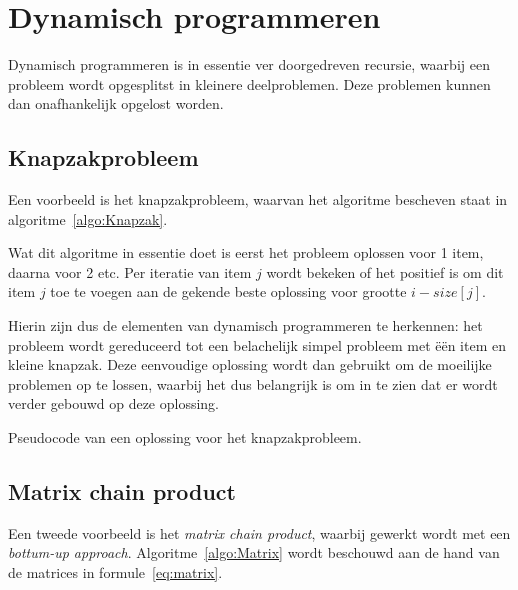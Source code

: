\chapter{Dynamisch programmeren}
Dynamisch programmeren is in essentie ver doorgedreven recursie, waarbij een probleem wordt opgesplitst in kleinere deelproblemen.
Deze problemen kunnen dan onafhankelijk opgelost worden.

\section{Knapzakprobleem}
Een voorbeeld is het knapzakprobleem, waarvan het algoritme bescheven staat in algoritme~\ref{algo:Knapzak}.

Wat dit algoritme in essentie doet is eerst het probleem oplossen voor 1 item, daarna voor 2 etc. 
Per iteratie van item $j$ wordt bekeken of het positief is om dit item $j$ toe te voegen aan de gekende beste oplossing voor grootte $i - size[j]$.

Hierin zijn dus de elementen van dynamisch programmeren te herkennen: het probleem wordt gereduceerd tot een belachelijk simpel probleem met \"e\"en item en kleine knapzak.
Deze eenvoudige oplossing wordt dan gebruikt om de moeilijke problemen op te lossen, waarbij het dus belangrijk is om in te zien dat er wordt verder gebouwd op deze oplossing.

\begin{algorithm}
    \caption{Pseudocode van een oplossing voor het knapzakprobleem.}
    \label{algo:Knapzak}
    \begin{algorithmic}
         
             
                    \EndIf
                \EndIf
            \EndFor    
        \EndFor
    \end{algorithmic}
\end{algorithm}

\section{Matrix chain product}
Een tweede voorbeeld is het \emph{matrix chain product}, waarbij gewerkt wordt met een \emph{bottum-up approach}. 
Algoritme~\ref{algo:Matrix} wordt beschouwd aan de hand van de matrices in formule~\ref{eq:matrix}.

